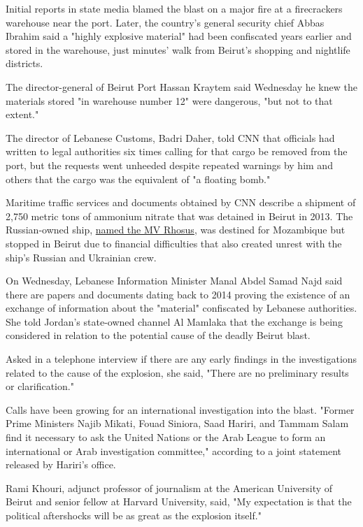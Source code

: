 Initial reports in state media blamed the blast on a major fire at a
firecrackers warehouse near the port. Later, the country's general
security chief Abbas Ibrahim said a "highly explosive material" had been
confiscated years earlier and stored in the warehouse, just minutes'
walk from Beirut's shopping and nightlife districts.

The director-general of Beirut Port Hassan Kraytem said Wednesday he
knew the materials stored "in warehouse number 12" were dangerous, "but
not to that extent."

The director of Lebanese Customs, Badri Daher, told CNN that officials
had written to legal authorities six times calling for that cargo be
removed from the port, but the requests went unheeded despite repeated
warnings by him and others that the cargo was the equivalent of "a
floating bomb."

Maritime traffic services and documents obtained by CNN describe a
shipment of 2,750 metric tons of ammonium nitrate that was detained in
Beirut in 2013. The Russian-owned ship,
\href{https://edition.cnn.com/2020/08/05/europe/lebanon-russian-ship-blast-intl/index.html}{named
the MV Rhosus}, was destined for Mozambique but stopped in Beirut due to
financial difficulties that also created unrest with the ship's Russian
and Ukrainian crew.

On Wednesday, Lebanese Information Minister Manal Abdel Samad Najd said
there are papers and documents dating back to 2014 proving the existence
of an exchange of information about the "material" confiscated by
Lebanese authorities. She told Jordan's state-owned channel Al Mamlaka
that the exchange is being considered in relation to the potential cause
of the deadly Beirut blast.

Asked in a telephone interview if there are any early findings in the
investigations related to the cause of the explosion, she said, "There
are no preliminary results or clarification."

Calls have been growing for an international investigation into the
blast. "Former Prime Ministers Najib Mikati, Fouad Siniora, Saad Hariri,
and Tammam Salam find it necessary to ask the United Nations or the Arab
League to form an international or Arab investigation committee,"
according to a joint statement released by Hariri's office.

Rami Khouri, adjunct professor of journalism at the American University
of Beirut and senior fellow at Harvard University, said, "My expectation
is that the political aftershocks will be as great as the explosion
itself."

